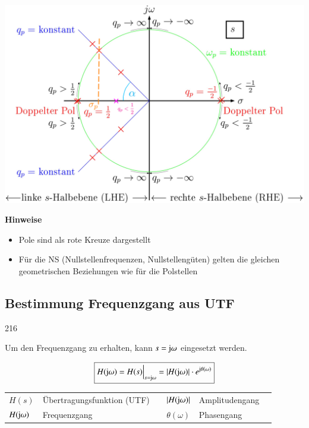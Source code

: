 \begin{minipage}[c]{0.55\columnwidth}
    \includegraphics[width=\columnwidth]{images/pole_nullstellen_koeffizienten.png}
\end{minipage}
\hfill
\begin{minipage}[c]{0.42\columnwidth}
    \raggedright%
    \textbf{Hinweise}
    \begin{itemize}
        \item Pole sind als rote Kreuze dargestellt
        \item Für die NS (Nullstellenfrequenzen, Nullstellengüten) gelten die gleichen
            geometrischen Beziehungen wie für die Polstellen
    \end{itemize}
\end{minipage}


\subsection{Bestimmung Frequenzgang aus UTF}{216}

Um den Frequenzgang zu erhalten, kann $s = \mathrm{j} \omega$ eingesetzt werden.

$$ \boxed{ H(\mathrm{j} \omega) = H(s) \Big|_{s = \mathrm{j} \omega} = |H(\mathrm{j} \omega)| \cdot e^{\mathrm{j} \theta(\omega)} } $$

\begin{center}
    \begin{tabular}{ll c | c ll}
        $H(s)$                  & Übertragungsfunktion (UTF)    & & $|H(\mathrm{j} \omega)|$    & Amplitudengang \\
        $H(\mathrm{j} \omega)$       & Frequenzgang                  & & $\theta(\omega)$       & Phasengang
    \end{tabular}
\end{center}


